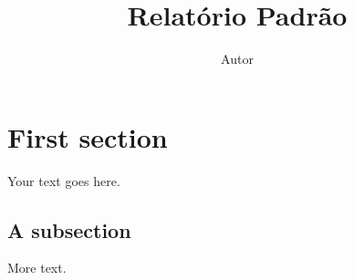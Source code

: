 \documentclass[11pt]{article} %
\title{Relatório Padrão}
\author{Autor}
\begin{document}
\maketitle

\section{First section}

Your text goes here.

\subsection{A subsection}

More text.
\end{document}
